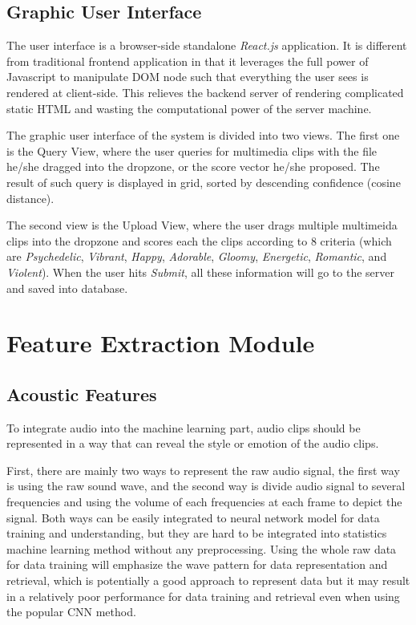 \documentclass{report}
\begin{document}
\subsection{Graphic User Interface}

The user interface is a browser-side standalone \textit{React.js} application. It is different from traditional frontend application in that it leverages the full power of Javascript to manipulate DOM node such that everything the user sees is rendered at client-side. This relieves the backend server of rendering complicated static HTML and wasting the computational power of the server machine.

The graphic user interface of the system is divided into two views. The first one is the Query View, where the user queries for multimedia clips with the file he/she dragged into the dropzone, or the score vector he/she proposed. The result of such query is displayed in grid, sorted by descending confidence (cosine distance).

The second view is the Upload View, where the user drags multiple multimeida clips into the dropzone and scores each the clips according to 8 criteria (which are \textit{Psychedelic}, \textit{Vibrant}, \textit{Happy}, \textit{Adorable}, \textit{Gloomy}, \textit{Energetic}, \textit{Romantic}, and \textit{Violent}). When the user hits \textit{Submit}, all these information will go to the server and saved into database.

\section{Feature Extraction Module}

\subsection{Acoustic Features}

To integrate audio into the machine learning part, audio clips should be represented in a way that can reveal the style or emotion of the audio clips. 

First, there are mainly two ways to represent the raw audio signal, the first way is using the raw sound wave, and the second way is divide audio signal to several frequencies and using the volume of each frequencies at each frame to depict the signal. Both ways can be easily integrated to neural network model for data training and understanding, but they are hard to be integrated into statistics machine learning method without any preprocessing. Using the whole raw data for data training will emphasize the wave pattern for data representation and retrieval, which is potentially a good approach to represent data but it may result in a relatively poor performance for data training and retrieval even when using the popular CNN method.
\end{document}
